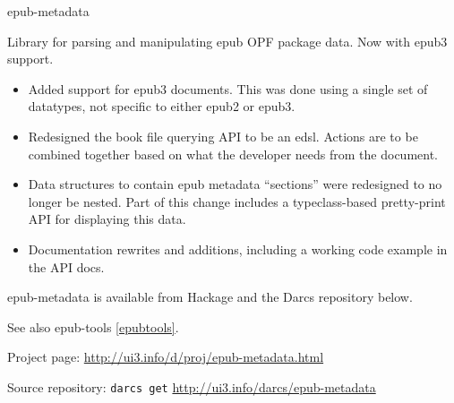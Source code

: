 \begin{hcarentry}{epub-metadata}
\label{epub-metadata}
\makeheader

Library for parsing and manipulating epub OPF package data. Now with epub3 support.

\begin{itemize}
\item Added support for epub3 documents. This was done using a single set of datatypes, not specific to either epub2 or epub3.
\item Redesigned the book file querying API to be an edsl. Actions are to be combined together based on what the developer needs from the document.
\item Data structures to contain epub metadata ``sections'' were redesigned to no longer be nested. Part of this change includes a typeclass-based pretty-print API for displaying this data.
\item Documentation rewrites and additions, including a working code example in the API docs.
\end{itemize}

epub-metadata is available from Hackage and the Darcs repository below.

See also epub-tools \cref{epubtools}.

\FurtherReading
\begin{compactitem}
\item Project page:
\url{http://ui3.info/d/proj/epub-metadata.html}

\item Source repository:
\texttt{darcs get} \url{http://ui3.info/darcs/epub-metadata}
\end{compactitem}
\end{hcarentry}
